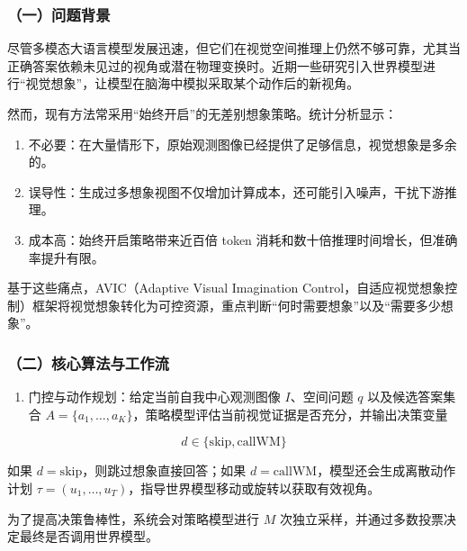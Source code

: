 \hypertarget{ux4e00ux95eeux9898ux80ccux666f-19}{%
\subsubsection{（一）问题背景}\label{ux4e00ux95eeux9898ux80ccux666f-19}}

尽管多模态大语言模型发展迅速，但它们在视觉空间推理上仍然不够可靠，尤其当正确答案依赖未见过的视角或潜在物理变换时。近期一些研究引入世界模型进行``视觉想象''，让模型在脑海中模拟采取某个动作后的新视角。

然而，现有方法常采用``始终开启''的无差别想象策略。统计分析显示：

\begin{enumerate}
\def\labelenumi{\arabic{enumi}.}
\tightlist
\item
  不必要：在大量情形下，原始观测图像已经提供了足够信息，视觉想象是多余的。
\item
  误导性：生成过多想象视图不仅增加计算成本，还可能引入噪声，干扰下游推理。
\item
  成本高：始终开启策略带来近百倍 token 消耗和数十倍推理时间增长，但准确率提升有限。
\end{enumerate}

基于这些痛点，AVIC（Adaptive Visual Imagination Control，自适应视觉想象控制）框架将视觉想象转化为可控资源，重点判断``何时需要想象''以及``需要多少想象''。

\hypertarget{ux4e8cux6838ux5fc3ux7b97ux6cd5ux4e0eux5de5ux4f5cux6d41-1}{%
\subsubsection{（二）核心算法与工作流}\label{ux4e8cux6838ux5fc3ux7b97ux6cd5ux4e0eux5de5ux4f5cux6d41-1}}

\begin{enumerate}
\def\labelenumi{\arabic{enumi}.}
\tightlist
\item
  门控与动作规划：给定当前自我中心观测图像 \(I\)、空间问题 \(q\) 以及候选答案集合 \(A=\{a_1,\ldots,a_K\}\)，策略模型评估当前视觉证据是否充分，并输出决策变量
\end{enumerate}

\[
d \in \{\mathrm{skip}, \mathrm{callWM}\}
\]

如果 \(d=\mathrm{skip}\)，则跳过想象直接回答；如果 \(d=\mathrm{callWM}\)，模型还会生成离散动作计划 \(\tau=(u_1,\ldots,u_T)\)，指导世界模型移动或旋转以获取有效视角。

为了提高决策鲁棒性，系统会对策略模型进行 \(M\) 次独立采样，并通过多数投票决定最终是否调用世界模型。

